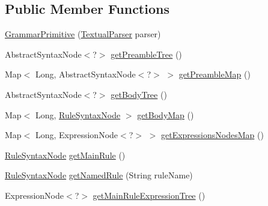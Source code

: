 \subsection*{Public Member Functions}
\begin{DoxyCompactItemize}
\item 
\hyperlink{classit_1_1emarolab_1_1cagg_1_1core_1_1language_1_1syntax_1_1GrammarPrimitive_a8a392c1dd29ec3c4821408f2121dc7e9}{Grammar\-Primitive} (\hyperlink{classit_1_1emarolab_1_1cagg_1_1core_1_1language_1_1parser_1_1TextualParser}{Textual\-Parser} parser)
\item 
Abstract\-Syntax\-Node$<$?$>$ \hyperlink{classit_1_1emarolab_1_1cagg_1_1core_1_1language_1_1syntax_1_1GrammarPrimitive_a051b3f4522727dd2b0ee6de426bd3d98}{get\-Preamble\-Tree} ()
\item 
Map$<$ Long, Abstract\-Syntax\-Node$<$?$>$ $>$ \hyperlink{classit_1_1emarolab_1_1cagg_1_1core_1_1language_1_1syntax_1_1GrammarPrimitive_a9e5de9c3a1a8aeee2980961040e2ba5a}{get\-Preamble\-Map} ()
\item 
Abstract\-Syntax\-Node$<$?$>$ \hyperlink{classit_1_1emarolab_1_1cagg_1_1core_1_1language_1_1syntax_1_1GrammarPrimitive_a9676d57b0504e475ad8d64141a0a707a}{get\-Body\-Tree} ()
\item 
Map$<$ Long, \hyperlink{classit_1_1emarolab_1_1cagg_1_1core_1_1language_1_1syntax_1_1abstractTree_1_1syntaxNodeType_1_1RuleSyntaxNode}{Rule\-Syntax\-Node} $>$ \hyperlink{classit_1_1emarolab_1_1cagg_1_1core_1_1language_1_1syntax_1_1GrammarPrimitive_a8645689b5a2001768d0229b41d2074f6}{get\-Body\-Map} ()
\item 
Map$<$ Long, Expression\-Node$<$?$>$ $>$ \hyperlink{classit_1_1emarolab_1_1cagg_1_1core_1_1language_1_1syntax_1_1GrammarPrimitive_a1b6a41ac719a57d6212bfec3dcf1fd7c}{get\-Expressions\-Nodes\-Map} ()
\item 
\hyperlink{classit_1_1emarolab_1_1cagg_1_1core_1_1language_1_1syntax_1_1abstractTree_1_1syntaxNodeType_1_1RuleSyntaxNode}{Rule\-Syntax\-Node} \hyperlink{classit_1_1emarolab_1_1cagg_1_1core_1_1language_1_1syntax_1_1GrammarPrimitive_ab823860fbadb4a8f6e071d23bf8fb676}{get\-Main\-Rule} ()
\item 
\hyperlink{classit_1_1emarolab_1_1cagg_1_1core_1_1language_1_1syntax_1_1abstractTree_1_1syntaxNodeType_1_1RuleSyntaxNode}{Rule\-Syntax\-Node} \hyperlink{classit_1_1emarolab_1_1cagg_1_1core_1_1language_1_1syntax_1_1GrammarPrimitive_ab4dc110a6bed5ad40a9c3ff396101e88}{get\-Named\-Rule} (String rule\-Name)
\item 
Expression\-Node$<$?$>$ \hyperlink{classit_1_1emarolab_1_1cagg_1_1core_1_1language_1_1syntax_1_1GrammarPrimitive_a3903903354a4f2a47cb102519e691a64}{get\-Main\-Rule\-Expression\-Tree} ()

\end{DoxyCompactItemize}
